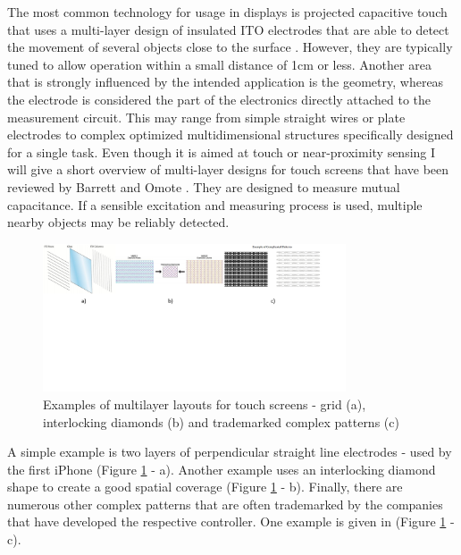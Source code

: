 The most common technology for usage in displays is projected capacitive touch that uses a multi-layer design of insulated ITO electrodes that are able to detect the movement of several objects close to the surface \cite{Barrett2010}. However, they are typically tuned to allow operation within a small distance of 1cm or less. 
Another area that is strongly influenced by the intended application is the geometry, whereas the electrode is considered the part of the electronics directly attached to the measurement circuit. This may range from simple straight wires or plate electrodes to complex optimized multidimensional structures specifically designed for a single task. Even though it is aimed at touch or near-proximity sensing I will give a short overview of  multi-layer designs for touch screens that have been reviewed by Barrett and Omote \cite{BarrettScreen}. They are designed to measure mutual capacitance. If a sensible excitation and measuring process is used, multiple nearby objects may be reliably detected. 
\begin{figure} [h]
\centering
\includegraphics[width=0.8\textwidth]{images/ito_multilayer} 
\caption{Examples of multilayer layouts for touch screens - grid (a), interlocking diamonds (b) and  trademarked complex patterns (c) \cite{BarrettScreen}}
\label{fig:ito_multilayer}
\end{figure}
A simple example is two layers of perpendicular straight line electrodes - used by the first iPhone (Figure \ref{fig:ito_multilayer} - a). Another example uses an interlocking diamond shape \cite{Dietz2001a} to create a good spatial coverage (Figure \ref{fig:ito_multilayer} - b). Finally, there are numerous other complex patterns that are often trademarked by the companies that have developed the respective controller. One example is given in (Figure \ref{fig:ito_multilayer} - c). 

